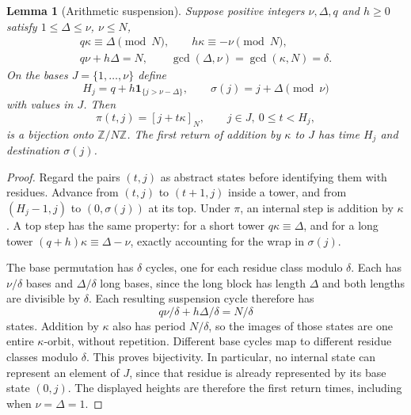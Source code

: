 \documentclass[11pt,a4paper]{article}
\newcommand{\Z}{\mathbb Z}
\newtheorem{lemma}[theorem]{Lemma}
\theoremstyle{definition}
\theoremstyle{remark}
\numberwithin{equation}{section}
\begin{document}
\begin{lemma}[Arithmetic suspension]\label{lem:suspension}
Suppose positive integers $\nu,\Delta,q$ and $h\ge0$ satisfy $1\le\Delta\le\nu$, $\nu\le N$,
\[
 \begin{gathered}
 q\kappa\equiv\Delta\pmod N,\qquad h\kappa\equiv-\nu\pmod N,\\
 q\nu+h\Delta=N,\qquad \gcd(\Delta,\nu)=\gcd(\kappa,N)=\delta.
 \end{gathered}
\]
On the bases $J=\{1,\ldots,\nu\}$ define
\[
 H_j=q+h\mathbf1_{\{j>\nu-\Delta\}},\qquad
 \sigma(j)=j+\Delta\pmod\nu
\]
with values in $J$. Then
\[
 \pi(t,j)=[j+t\kappa]_N,\qquad j\in J,\ 0\le t<H_j,
\]
is a bijection onto $\Z/N\Z$. The first return of addition by $\kappa$ to $J$ has time $H_j$ and destination $\sigma(j)$.
\end{lemma}
\begin{proof}
Regard the pairs $(t,j)$ as abstract states before identifying them
with residues. Advance from $(t,j)$ to $(t+1,j)$ inside a tower, and
from $(H_j-1,j)$ to $(0,\sigma(j))$ at its top. Under $\pi$, an internal
step is addition by $\kappa$. A top step has the same property: for a
short tower $q\kappa\equiv\Delta$, and for a long tower
$(q+h)\kappa\equiv\Delta-\nu$, exactly accounting for the wrap in
$\sigma(j)$.

The base permutation has $\delta$ cycles, one for each residue class
modulo $\delta$. Each has $\nu/\delta$ bases and $\Delta/\delta$ long
bases, since the long block has length $\Delta$ and both lengths are
divisible by $\delta$. Each resulting suspension cycle therefore has
\[
 q\nu/\delta+h\Delta/\delta=N/\delta
\]
states. Addition by $\kappa$ also has period $N/\delta$, so the images
of those states are one entire $\kappa$-orbit, without repetition.
Different base cycles map to different residue classes modulo $\delta$.
This proves bijectivity. In particular, no internal state can represent
an element of $J$, since that residue is already represented by its
base state $(0,j)$. The displayed heights are therefore the first
return times, including when $\nu=\Delta=1$.
\end{proof}
\end{document}
